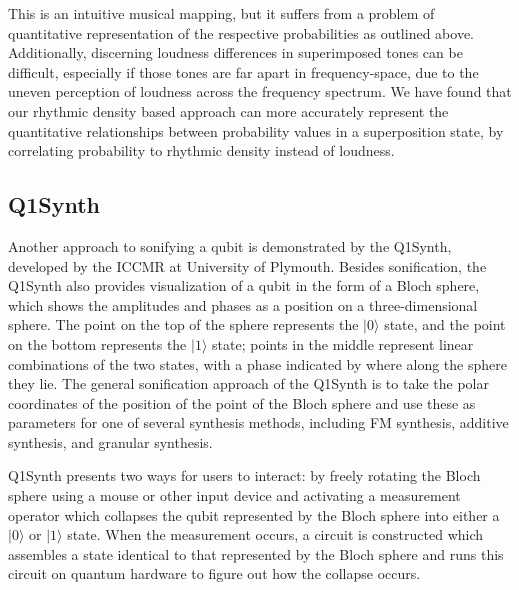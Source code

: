\documentclass[10pt,twocolumn]{article}
\begin{document}
This is an intuitive musical mapping, but it suffers from a problem of quantitative representation of the respective probabilities as outlined above. Additionally, discerning loudness differences in superimposed tones can be difficult, especially if those tones are far apart in frequency-space, due to the uneven perception of loudness across the frequency spectrum\cite{smyth2019}. We have found that our rhythmic density based approach can more accurately represent the quantitative relationships between probability values in a superposition state, by correlating probability to rhythmic density instead of loudness.

\subsection{Q1Synth}

Another approach to sonifying a qubit is demonstrated by the Q1Synth\cite{q1synth}, developed by the ICCMR at University of Plymouth. Besides sonification, the Q1Synth also provides visualization of a qubit in the form of a Bloch sphere, which shows the amplitudes and phases as a position on a three-dimensional sphere. The point on the top of the sphere represents the $|0\rangle$ state, and the point on the bottom represents the $|1\rangle$ state; points in the middle represent linear combinations of the two states, with a phase indicated by where along the sphere they lie. The general sonification approach of the Q1Synth is to take the polar coordinates of the position of the point of the Bloch sphere and use these as parameters for one of several synthesis methods, including FM synthesis, additive synthesis, and granular synthesis.

Q1Synth presents two ways for users to interact: by freely rotating the Bloch sphere using a mouse or other input device and activating a measurement operator which collapses the qubit represented by the Bloch sphere into either a $|0\rangle$ or $|1\rangle$ state. When the measurement occurs, a circuit is constructed which assembles a state identical to that represented by the Bloch sphere and runs this circuit on quantum hardware to figure out how the collapse occurs.
\end{document}
